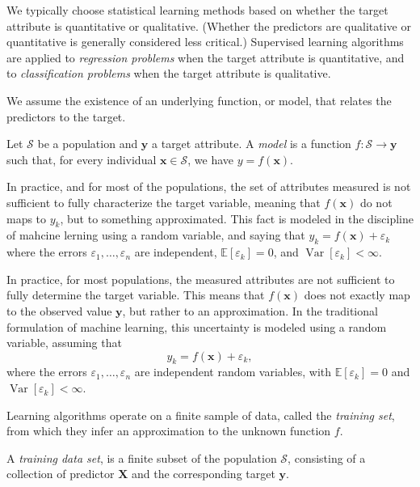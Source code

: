We typically choose statistical learning methods based on whether the target attribute is quantitative or qualitative. (Whether the predictors are qualitative or quantitative is generally considered less critical.) Supervised learning algorithms are applied to \emph{regression problems} when the target attribute is quantitative, and to \emph{classification problems} when the target attribute is qualitative.

We assume the existence of an underlying function, or model, that relates the predictors to the target.

\begin{definition}
Let $\mathcal{S}$ be a population and $\mathbf{y}$ a target attribute. A \emph{model} is a function $f: \mathcal{S} \rightarrow \mathbf{y}$ such that, for every individual $\mathbf{x} \in \mathcal{S}$, we have $y = f(\mathbf{x})$.
\end{definition}

In practice, and for most of the populations, the set of attributes measured is not sufficient to fully characterize the target variable, meaning that $f(\mathbf{x})$ do not maps to $y_k$, but to something approximated. This fact is modeled in the discipline of mahcine lerning using a random variable, and saying that $y_k = f(\mathbf{x}) + \varepsilon_{k}$ where the errors $\varepsilon_{1},\dots,\varepsilon_{n}$ are independent, $\mathbb{E}[\varepsilon_{k}]=0$, and $\operatorname{Var}[\varepsilon_{k}]<\infty$.


In practice, for most populations, the measured attributes are not sufficient to fully determine the target variable. This means that $f(\mathbf{x})$ does not exactly map to the observed value $\mathbf{y}$, but rather to an approximation. In the traditional formulation of machine learning, this uncertainty is modeled using a random variable, assuming that
\[
y_k = f(\mathbf{x}) + \varepsilon_k,
\]
where the errors $\varepsilon_1, \dots, \varepsilon_n$ are independent random variables, with $\mathbb{E}[\varepsilon_k] = 0$ and $\operatorname{Var}[\varepsilon_k] < \infty$.

Learning algorithms operate on a finite sample of data, called the \emph{training set}, from which they infer an approximation to the unknown function $f$.

\begin{definition}
A \emph{training data set}, is a finite subset of the population $\mathcal{S}$, consisting of a collection of predictor $\mathbf{X}$ and the corresponding target $\mathbf{y}$.
\end{definition}

